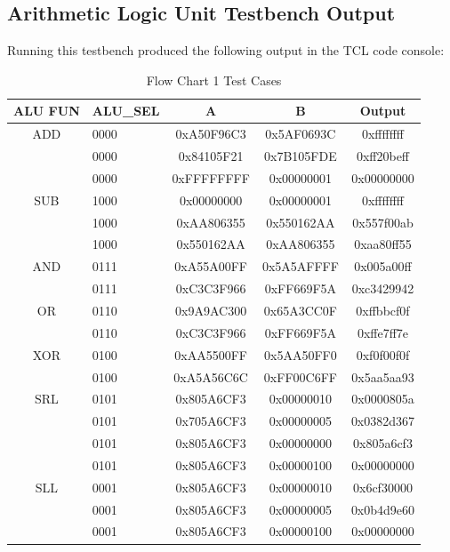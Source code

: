 \documentclass[
    a4paper, %
	12pt, %
    ]{CSSullivanBusinessReport}
\begin{document}
\begin{fullwidth}
\subsection{Arithmetic Logic Unit Testbench Output} %
Running this testbench produced the following output in the TCL code console:
\begin{table}[H]
    \centering
    \footnotesize
    \captionsetup{style=widetable}
    \caption{Flow Chart 1 Test Cases}
    \begin{tabular}{|c||l|c|c|c|}
    \hline
     ALU FUN &ALU\_SEL&A& B& Output\\\hline
    \hline
    ADD&0000&0xA50F96C3& 0x5AF0693C& 0xffffffff\\\hline
    &0000&0x84105F21& 0x7B105FDE& 0xff20beff\\\hline
    &0000&0xFFFFFFFF& 0x00000001& 0x00000000\\\hline
    \hline
    SUB&1000& 0x00000000& 0x00000001&0xffffffff\\\hline
    &1000& 0xAA806355& 0x550162AA& 0x557f00ab\\\hline
    &1000& 0x550162AA& 0xAA806355&0xaa80ff55\\\hline
    \hline
    AND&0111& 0xA55A00FF& 0x5A5AFFFF&0x005a00ff\\\hline
    &0111& 0xC3C3F966& 0xFF669F5A&0xc3429942\\\hline
    \hline
    OR&0110& 0x9A9AC300& 0x65A3CC0F&0xffbbcf0f\\\hline
    &0110& 0xC3C3F966& 0xFF669F5A&0xffe7ff7e\\\hline
    \hline
    XOR&0100& 0xAA5500FF& 0x5AA50FF0&0xf0f00f0f\\\hline
    &0100& 0xA5A56C6C& 0xFF00C6FF&0x5aa5aa93\\\hline
    \hline
    SRL&0101& 0x805A6CF3& 0x00000010&0x0000805a\\\hline
    &0101& 0x705A6CF3& 0x00000005&0x0382d367\\\hline
    &0101& 0x805A6CF3& 0x00000000&0x805a6cf3\\\hline
    &0101& 0x805A6CF3& 0x00000100&0x00000000\\\hline
    \hline
    SLL&0001& 0x805A6CF3& 0x00000010&0x6cf30000\\\hline
    &0001& 0x805A6CF3& 0x00000005&0x0b4d9e60\\\hline
    &0001& 0x805A6CF3& 0x00000100&0x00000000\\\hline

\end{tabular}
\end{table}
\end{fullwidth}
\end{document}
